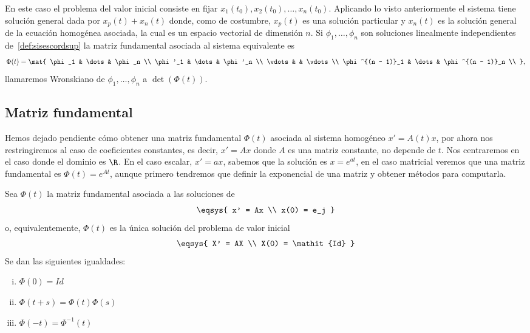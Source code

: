 \documentclass[../main.tex]{subfiles}
\begin{document}
En este caso el problema del valor inicial consiste en fijar \(x_1(t_0), 
x_2(t_0), \dots, x_n(t_0)\). Aplicando lo visto anteriormente el sistema tiene
solución general dada por \(x_p(t) + x_n(t)\) donde, como de costumbre, 
\(x_p(t)\) es una solución particular y \(x_n(t)\) es la solución general de la
ecuación homogénea asociada, la cual es un espacio vectorial de dimensión \(n\).
Si \(\phi_1, \dots, \phi_n\) son soluciones linealmente independientes 
de~\ref{def:sisescordsup} la matriz fundamental asociada al sistema equivalente
es
\[\Phi(t) = \mat{
	\phi_1 & \dots & \phi_n \\ 
	\phi'_1 & \dots & \phi'_n \\ 
	\vdots & & \vdots \\ 
	\phi^{(n - 1)}_1 & \dots & \phi^{(n - 1)}_n \\ 
	},\]
llamaremos Wronskiano de \(\phi_1, \dots, \phi_n\) a \(\det(\Phi(t))\).

\subsection{Matriz fundamental}

Hemos dejado pendiente cómo obtener una matriz fundamental \(\Phi(t)\) asociada
al sistema homogéneo \(x' = A(t)x\), por ahora nos restringiremos al caso de
coeficientes constantes, es decir, \(x' = Ax\) donde \(A\) es una matriz
constante, no depende de \(t\). Nos centraremos en el caso donde el dominio es 
\(\R\). En el caso escalar, \(x' = ax\), sabemos que la solución es 
\(x = e^{at}\), en el caso matricial veremos que una matriz fundamental es
\(\Phi(t) = e^{At}\), aunque primero tendremos que definir la exponencial de una
matriz y obtener métodos para computarla.

\begin{lemma}
\label{lem:expphi}
	Sea \(\Phi(t)\) la matriz fundamental asociada a las soluciones de
	\[\eqsys{
		x' = Ax \\
		x(0) = e_j
		}\]
	o, equivalentemente, \(\Phi(t)\) es la única solución del problema de valor
	inicial
	\[\eqsys{
		X' = AX \\
		X(0) = \mathit{Id}
		}\]
	Se dan las siguientes igualdades:
	\begin{multicols}{3}
	\begin{enumerate}[i)]
		\item \(\displaystyle \Phi(0) = \mathit{Id}\) 
		\item \(\displaystyle \Phi(t + s) = \Phi(t) \Phi(s)\) 
		\item \(\displaystyle \Phi(-t) = \Phi^{-1}(t)\) 
	\end{enumerate}
	\end{multicols}
\end{lemma}
\end{document}

